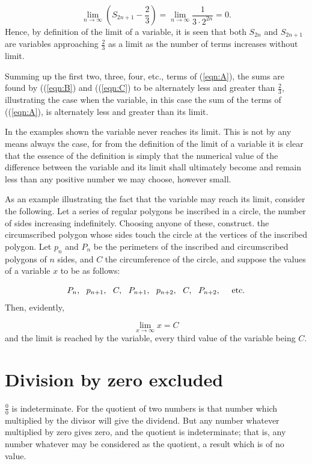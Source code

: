 \begin{enumerate}
\[
\lim_{n \to \infty} \left ( S_{2n + 1} - \frac{2}{3} \right ) 	
= \lim_{n \to \infty} \frac{1}{3 \cdot 2^{2n}} = 0.
\]
Hence, by definition of the limit of a variable, it is seen 
that both $S_{2n}$ and $S_{2n + 1}$ are variables approaching 
$\frac{2}{3}$ as a limit as the number of terms increases without limit.

Summing up the first two, three, four, etc., terms of (\ref{eqn:A}), 
the sums are found by ((\ref{eqn:B}) and ((\ref{eqn:C}) to 
be alternately less and greater than $\frac{2}{3}$, illustrating 
the case when the variable, in this case the sum of the terms 
of ((\ref{eqn:A}), is alternately less and greater than its limit.
\end{enumerate}

In the examples shown the variable never reaches its limit. 
This is not by any means always the case, for from the definition 
of the limit of a variable it is clear that the essence of the 
definition is simply that the numerical value of the difference 
between the variable and its limit shall ultimately become and 
remain less than any positive number we may choose, however small.

\begin{example}
As an example illustrating the fact that the variable may 
reach its limit, consider the following. Let a series of regular 
polygons be inscribed in a circle, the number of sides increasing 
indefinitely. Choosing anyone of these, construct. the circumscribed 
polygon whose sides touch the circle at the vertices of the inscribed
polygon. Let $p_n$ and $P_n$ be the perimeters of the inscribed and 
circumscribed polygons of $n$ sides, and $C$ the circumference 
of the circle, and suppose the values of a variable $x$ to be as follows:

\[
 P_n,\ \  p_{n + 1},\ \  C,\ \  P_{n + 1},\ \  p_{n + 2},\ \  C,\ \  P_{n + 2},
\ \ \ \ {\rm etc.}
\]
Then, evidently,

\[
    \lim_{x \to \infty} x = C
\]
and the limit is reached by the variable, every third value of the 
variable being $C$.
\end{example}

\section{Division by zero excluded}
\label{sec:14}

$\frac{0}{0}$ is indeterminate. For the quotient of two numbers 
is that number which multiplied by the divisor will give 
the dividend. But any number whatever multiplied by zero 
gives zero, and the quotient is indeterminate; that is, 
any number whatever may be considered as the quotient, a 
result which is of no value.

